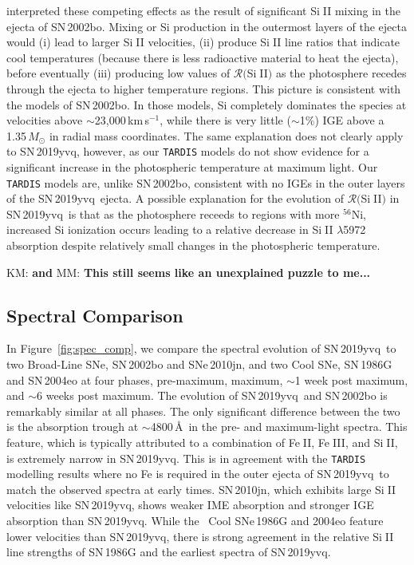 \documentclass[twocolumn]{aastex63}
\def\ion#1#2{#1$\;${\footnotesize\rm{#2}}\relax}
\newcommand{\kate}[1]{{\color{red} KM: \textbf{#1}}}
\newcommand{\magee}[1]{{\color{Rust} MM: \textbf{#1}}}
\newcommand{\kms}{km\,s$^{-1}$}
\newcommand{\radni}{$^{56}$Ni}
\newcommand{\sn}{SN\,2019yvq}
\begin{document}
\citet{Benetti04} interpreted these competing effects as the result of
significant \ion{Si}{II} mixing in the ejecta of SN\,2002bo. Mixing or Si
production in the outermost layers of the ejecta would (i) lead to larger
\ion{Si}{II} velocities, (ii) produce \ion{Si}{II} line ratios that indicate
cool temperatures (because there is less radioactive material to heat the
ejecta), before eventually (iii) producing low values of
$\mathcal{R}($\ion{Si}{II}$)$ as the photosphere recedes through the ejecta to
higher temperature regions. This picture is consistent with the
\citet{Stehle05} models of SN\,2002bo. In those models, Si completely
dominates the species at velocities above $\sim$23,000\,\kms, while there is
very little ($\sim$1\%) IGE above a 1.35\,$M_\odot$ in radial mass
coordinates. The same explanation does not clearly apply to \sn, however, as
our \texttt{TARDIS} models do not show evidence for a significant increase in
the photospheric temperature at maximum light. Our \texttt{TARDIS} models are,
unlike SN\,2002bo, consistent with no IGEs in the outer layers of the \sn\
ejecta. A possible explanation for the evolution of
$\mathcal{R}($\ion{Si}{II}$)$ in \sn\ is that as the photosphere receeds to
regions with more \radni, increased Si ionization occurs leading to a relative
decrease in \ion{Si}{II} $\lambda$5972 absorption despite relatively small
changes in the photospheric temperature.

\kate{and} \magee{This still seems like an unexplained puzzle to me...}

\subsection{Spectral Comparison}\label{sec:spec_comp}

In Figure~\ref{fig:spec_comp}, we compare the spectral evolution of \sn\ to
two Broad-Line SNe, SN\,2002bo and SNe\,2010jn, and two Cool SNe, SN\,1986G
and SN\,2004eo \citep{Cristiani92,
Benetti04,Pastorello07,Silverman11,Hachinger13,Maguire14} at four phases,
pre-maximum, maximum, $\sim$1 week post maximum, and $\sim$6 weeks post
maximum. The evolution of \sn\ and SN\,2002bo is remarkably similar at all
phases. The only significant difference between the two is the absorption
trough at $\sim$4800\,\AA\ in the pre- and maximum-light spectra. This
feature, which is typically attributed to a combination of \ion{Fe}{II},
\ion{Fe}{III}, and \ion{Si}{II}, is extremely narrow in \sn. This is in
agreement with the \texttt{TARDIS} modelling results where no Fe is required
in the outer ejecta of \sn\ to match the observed spectra at early times.
SN\,2010jn, which exhibits large \ion{Si}{II} velocities like \sn, shows
weaker IME absorption and stronger IGE absorption than \sn. While the
\citeauthor{Branch06}~Cool SNe\,1986G and 2004eo feature lower velocities than
\sn, there is strong agreement in the relative \ion{Si}{II} line strengths of
SN\,1986G and the earliest spectra of \sn.
\end{document}
